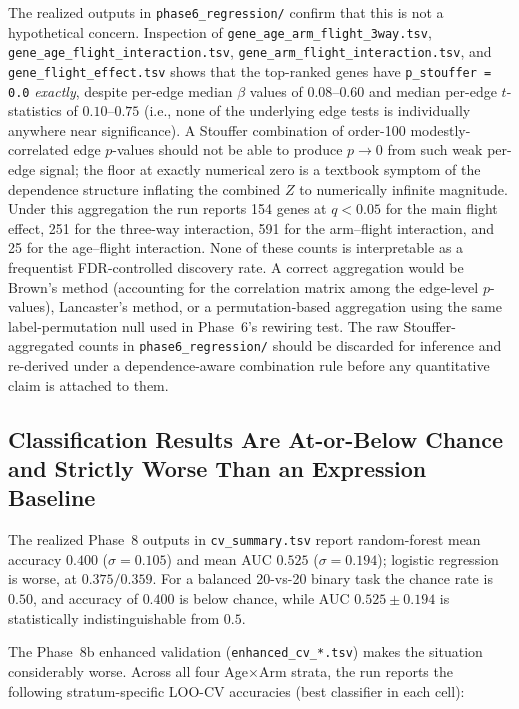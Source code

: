 \documentclass[11pt]{article}
\newcommand{\code}[1]{\texttt{#1}}
\begin{document}
The realized outputs in \code{phase6\_regression/} confirm that this is not a hypothetical concern. Inspection of \code{gene\_age\_arm\_flight\_3way.tsv}, \code{gene\_age\_flight\_interaction.tsv}, \code{gene\_arm\_flight\_interaction.tsv}, and \code{gene\_flight\_effect.tsv} shows that the top-ranked genes have \code{p\_stouffer = 0.0} \emph{exactly}, despite per-edge median $\beta$ values of $0.08$--$0.60$ and median per-edge $t$-statistics of $0.10$--$0.75$ (i.e., none of the underlying edge tests is individually anywhere near significance). A Stouffer combination of order-100 modestly-correlated edge $p$-values should not be able to produce $p \to 0$ from such weak per-edge signal; the floor at exactly numerical zero is a textbook symptom of the dependence structure inflating the combined $Z$ to numerically infinite magnitude. Under this aggregation the run reports 154 genes at $q{<}0.05$ for the main flight effect, 251 for the three-way interaction, 591 for the arm--flight interaction, and 25 for the age--flight interaction. None of these counts is interpretable as a frequentist FDR-controlled discovery rate. A correct aggregation would be Brown's method (accounting for the correlation matrix among the edge-level $p$-values), Lancaster's method, or a permutation-based aggregation using the same label-permutation null used in Phase~6's rewiring test. The raw Stouffer-aggregated counts in \code{phase6\_regression/} should be discarded for inference and re-derived under a dependence-aware combination rule before any quantitative claim is attached to them.

\subsection{Classification Results Are At-or-Below Chance and Strictly Worse Than an Expression Baseline}
The realized Phase~8 outputs in \code{cv\_summary.tsv} report random-forest mean accuracy $0.400$ ($\sigma{=}0.105$) and mean AUC $0.525$ ($\sigma{=}0.194$); logistic regression is worse, at $0.375 / 0.359$. For a balanced 20-vs-20 binary task the chance rate is $0.50$, and accuracy of $0.400$ is below chance, while AUC $0.525\pm 0.194$ is statistically indistinguishable from $0.5$.

The Phase~8b enhanced validation (\code{enhanced\_cv\_*.tsv}) makes the situation considerably worse. Across all four Age$\times$Arm strata, the run reports the following stratum-specific LOO-CV accuracies (best classifier in each cell):
\end{document}
